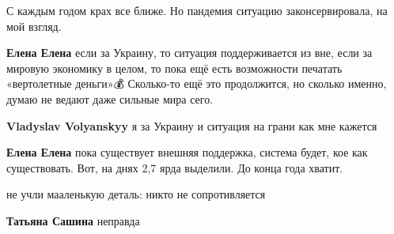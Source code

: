 \begin{itemize}
С каждым годом крах все ближе. Но пандемия ситуацию законсервировала, на мой
взгляд.

\begin{itemize}
 
\textbf{Елена Елена} если за Украину, то ситуация поддерживается из вне, если
за мировую экономику в целом, то пока ещё есть возможности печатать
«вертолетные деньги»💰 Сколько-то ещё это продолжится, но сколько именно, думаю
не ведают даже сильные мира сего.

 
\textbf{Vladyslav Volyanskyy} я за Украину и ситуация на грани как мне кажется

 
\textbf{Елена Елена} пока существует внешняя поддержка, система будет, кое как
существовать. Вот, на днях 2,7 ярда выделили. До конца года хватит.
\end{itemize}

 
не учли мааленькую деталь: никто не сопротивляется

\begin{itemize}
 
\textbf{Татьяна Сашина} неправда

 

\end{itemize}
\end{itemize}
